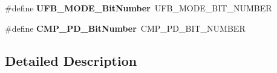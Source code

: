 \begin{DoxyCompactItemize}
\item 
\hypertarget{group___h_a_l___aliased___macros_gaa531b9c8535235ee73455c2b88663c03}{\#define {\bfseries U\-F\-B\-\_\-\-M\-O\-D\-E\-\_\-\-Bit\-Number}~U\-F\-B\-\_\-\-M\-O\-D\-E\-\_\-\-B\-I\-T\-\_\-\-N\-U\-M\-B\-E\-R}\label{group___h_a_l___aliased___macros_gaa531b9c8535235ee73455c2b88663c03}

\item 
\hypertarget{group___h_a_l___aliased___macros_ga0ca336e48ea4840c7d1cde05a0e07e82}{\#define {\bfseries C\-M\-P\-\_\-\-P\-D\-\_\-\-Bit\-Number}~C\-M\-P\-\_\-\-P\-D\-\_\-\-B\-I\-T\-\_\-\-N\-U\-M\-B\-E\-R}\label{group___h_a_l___aliased___macros_ga0ca336e48ea4840c7d1cde05a0e07e82}

\end{DoxyCompactItemize}


\subsection{Detailed Description}
